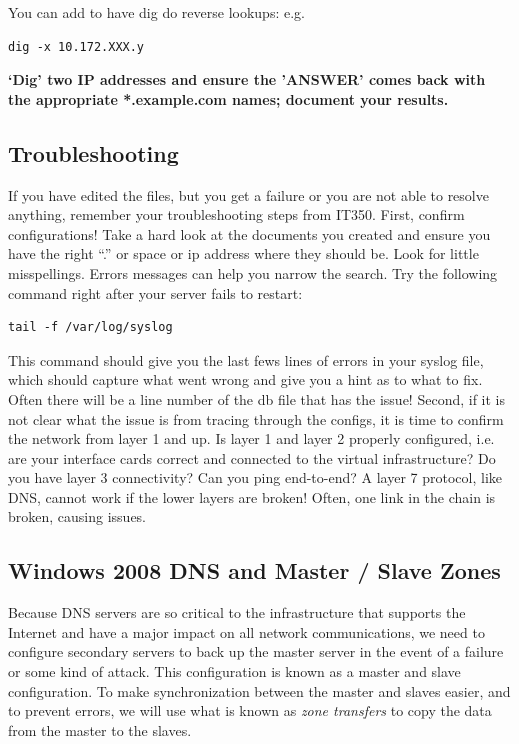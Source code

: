 \documentclass{article}
\begin{document}
You can add  to have dig do reverse lookups: e.g. \begin{verbatim}
dig -x 10.172.XXX.y
\end{verbatim}
\textbf{ \question `Dig' two IP addresses and ensure the 'ANSWER' comes back with the appropriate *.example.com names; document your results.}

\subsection{Troubleshooting}
If you have edited the files, but you get a failure or you are not able to resolve anything, remember your troubleshooting steps from IT350.  First, confirm configurations! Take a hard look at the documents you created and ensure you have the right ``.'' or space or ip address where they should be. Look for little
misspellings. Errors messages can help you narrow the search. 
Try the following command right after your server fails to
restart:
\begin{verbatim}
tail -f /var/log/syslog
\end{verbatim}
This command should give you the last fews lines of errors in your syslog file, which should capture what went wrong and give you a hint as to what to fix.  Often there will be a line number of the db file that has the issue!
Second, if it is not clear what the issue is from tracing through the configs, it is time to confirm the network from layer 1 and up.  Is layer 1 and layer 2 properly configured, i.e. are your interface cards correct and connected to the virtual infrastructure? Do you have layer 3 connectivity?  Can you ping end-to-end?  A layer 7 protocol, like DNS, cannot work if the lower layers are broken! Often, one link in the chain is broken, causing issues.   

\subsection{Windows 2008 DNS and Master / Slave Zones}
Because DNS servers are so critical to the infrastructure that supports the Internet and have a major impact on all network communications, we need to configure secondary servers to back up the master server in the event of a failure or some kind of attack. This configuration is known as a master and slave configuration. To make synchronization between the master and slaves easier, and to prevent errors, we will use what is known as  \textit{zone transfers} to copy the data from the master to the slaves.
\end{document}
